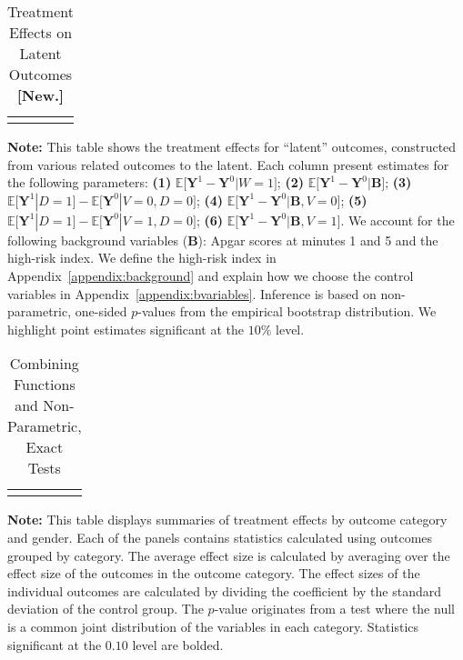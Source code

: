 \begin{sidewaystable}[!htpb]
\begin{threeparttable}
\caption{Treatment Effects on Latent Outcomes \textbf{[New.]}} \label{table:treatfactors}
\centering 
\begin{tabularx}{22.5cm}{XcX}
&  & 
\end{tabularx}
\begin{tablenotes}
\footnotesize
\item \textbf{Note:} This table shows the treatment effects for ``latent'' outcomes, constructed from various related outcomes to the latent. Each column present estimates for the following parameters: \textbf{(1)} $\mathbb{E} \big[ \bm{Y}^1 - \bm{Y}^0 | W = 1]$; {\textbf{(2)} $\mathbb{E} \big[ \bm{Y}^1 - \bm{Y}^0 | \bm{B} \big]$}; {\textbf{(3)} $\mathbb{E} \big[ \bm{Y}^1 | D=1 \big] - \mathbb{E} \big[ \bm{Y}^0 | V=0, D=0 \big]$}; {\textbf{(4)} $\mathbb{E} \big[ \bm{Y}^1 - \bm{Y}^0 | \bm{B}, V=0 \big] $}; {\textbf{(5)} $\mathbb{E} \big[ \bm{Y}^1 | D=1 \big] - \mathbb{E} \big[ \bm{Y}^0 | V=1, D = 0 \big]$}; {\textbf{(6)} $\mathbb{E} \big[ \bm{Y}^1 - \bm{Y}^0 | \bm{B}, V=1 \big]$}. We account for the following background variables ($\bm{B}$): Apgar scores at minutes 1 and 5 and the high-risk index. We define the high-risk index in Appendix~\ref{appendix:background} and explain how we choose the control variables in Appendix~\ref{appendix:bvariables}. Inference is based on non-parametric, one-sided $p$-values from the empirical bootstrap distribution. We highlight point estimates significant at the $10\%$ level.
\end{tablenotes}
\end{threeparttable}
\end{sidewaystable}

\begin{table}[!htpb]
\begin{threeparttable}
\caption{Combining Functions and Non-Parametric, Exact Tests} \label{table:massiveall}
\centering
\begin{tabularx}{16.75cm}{XcX}
&  & 
\end{tabularx}
\begin{tablenotes}
\footnotesize
\item \textbf{Note:} This table displays summaries of treatment effects by outcome category and gender. Each of the panels contains statistics calculated using outcomes grouped by category. The average effect size is calculated by averaging over the effect size of the outcomes in the outcome category. The effect sizes of the individual outcomes are calculated by dividing the coefficient by the standard deviation of the control group.  The \citet{Rosenbaum_2005_Distribution_JRSS} $p$-value originates from a test where the null is a common joint distribution of the variables in each category. Statistics significant at the $0.10$ level are bolded.
\end{tablenotes}
\end{threeparttable}
\end{table}


